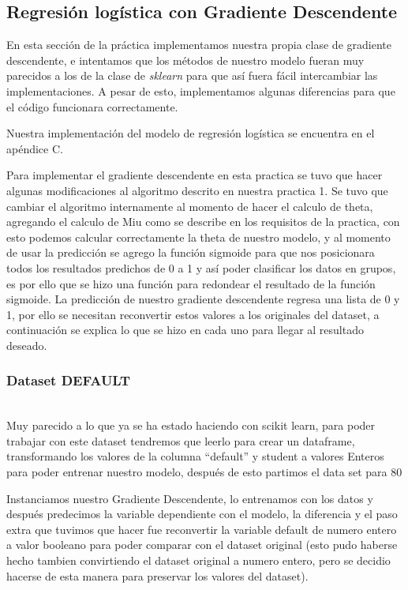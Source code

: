 \documentclass[sigconf,authorversion,nonacm]{acmart}
\begin{document}
\subsection{Regresión logística con Gradiente Descendente}
En esta sección de la práctica implementamos nuestra propia clase de gradiente descendente, e intentamos que los métodos de nuestro modelo fueran muy parecidos a los de la clase de \textit{sklearn} para que así fuera fácil intercambiar las implementaciones. A pesar de esto, implementamos algunas diferencias para que el código funcionara correctamente.

Nuestra implementación del modelo de regresión logística se encuentra en el apéndice C.

Para implementar el gradiente descendente en esta practica se tuvo que hacer algunas modificaciones al algoritmo descrito en nuestra practica 1. Se tuvo que cambiar el algoritmo internamente al momento de hacer el calculo de theta, agregando el calculo de Miu como se describe en los requisitos de la practica, con esto podemos calcular correctamente la theta de nuestro modelo, y al momento de usar la predicción se agrego la función sigmoide para que nos posicionara todos los resultados predichos de 0 a 1 y así poder clasificar los datos en grupos, es por ello que se hizo una función para redondear el resultado de la función sigmoide. La predicción de nuestro gradiente descendente regresa una lista de 0 y 1, por ello se necesitan reconvertir estos valores a los originales del dataset, a continuación se explica lo que se hizo en cada uno para llegar al resultado deseado.

\subsubsection{Dataset DEFAULT}\hfill\\
Muy parecido a lo que ya se ha estado haciendo con scikit learn, para poder trabajar con este dataset tendremos que leerlo para crear un dataframe, transformando los valores de la columna “default” y student a valores Enteros para poder entrenar nuestro modelo, después de esto partimos el data set para 80%

Instanciamos nuestro Gradiente Descendente, lo entrenamos con los datos y después predecimos la variable dependiente con el modelo, la diferencia y el paso extra que tuvimos que hacer fue reconvertir la variable default de numero entero a valor booleano para poder comparar con el dataset original (esto pudo haberse hecho tambien convirtiendo el dataset original a numero entero, pero se decidio hacerse de esta manera para preservar los valores del dataset).
\end{document}
